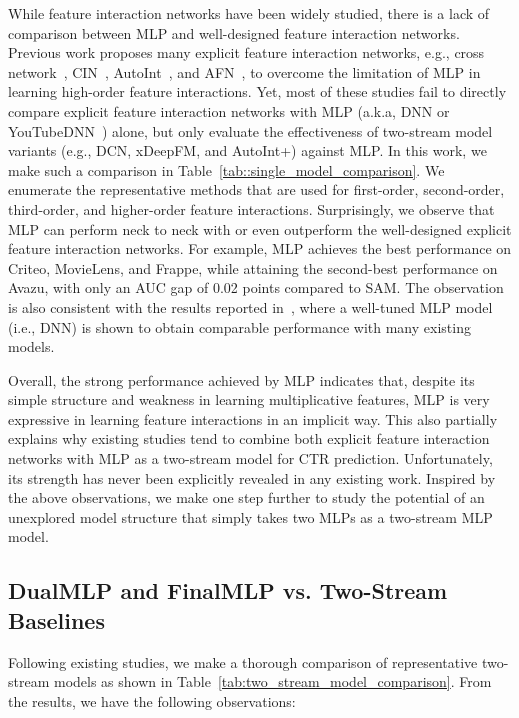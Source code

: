 \documentclass[letterpaper]{article} \usepackage{aaai23}  \usepackage{times}  \usepackage{helvet}  \usepackage{courier}  \usepackage[hyphens]{url}  \usepackage{graphicx} \urlstyle{rm} \def\UrlFont{\rm}  \usepackage{natbib}  \usepackage{caption} \frenchspacing  \setlength{\pdfpagewidth}{8.5in}  \setlength{\pdfpageheight}{11in}  \usepackage{algorithm}
\begin{document}
While feature interaction networks have been widely studied, there is a lack of comparison between MLP and well-designed feature interaction networks. Previous work proposes many explicit feature interaction networks, e.g., cross network~\cite{DCN}, CIN~\cite{xDeepFM}, AutoInt~\cite{autoint}, and AFN~\cite{AFN}, to overcome the limitation of MLP in learning high-order feature interactions. Yet, most of these studies fail to directly compare explicit feature interaction networks with MLP (a.k.a, DNN or YouTubeDNN~\cite{DNN}) alone, but only evaluate the effectiveness of two-stream model variants (e.g., DCN, xDeepFM, and AutoInt+) against MLP. In this work, we make such a comparison in Table~\ref{tab::single_model_comparison}. 
We enumerate the representative methods that are used for first-order, second-order, third-order, and higher-order feature interactions. Surprisingly, we observe that MLP can perform neck to neck with or even outperform the well-designed explicit feature interaction networks. For example, MLP achieves the best performance on Criteo, MovieLens, and Frappe, while attaining the second-best performance on Avazu, with only an AUC gap of 0.02 points compared to SAM. The observation is also consistent with the results reported in~\cite{DCN_V2}, where a well-tuned MLP model (i.e., DNN) is shown to obtain comparable performance with many existing models. 

Overall, the strong performance achieved by MLP indicates that, despite its simple structure and weakness in learning multiplicative features, MLP is very expressive in learning feature interactions in an implicit way. This also partially explains why existing studies tend to combine both explicit feature interaction networks with MLP as a two-stream model for CTR prediction. Unfortunately, its strength has never been explicitly revealed in any existing work. Inspired by the above observations, we make one step further to study the potential of an unexplored model structure that simply takes two MLPs as a two-stream MLP model. 















\subsection{DualMLP and FinalMLP vs. Two-Stream Baselines}
Following existing studies, we make a thorough comparison of representative two-stream models as shown in Table~\ref{tab:two_stream_model_comparison}. From the results, we have the following observations:
\end{document}

